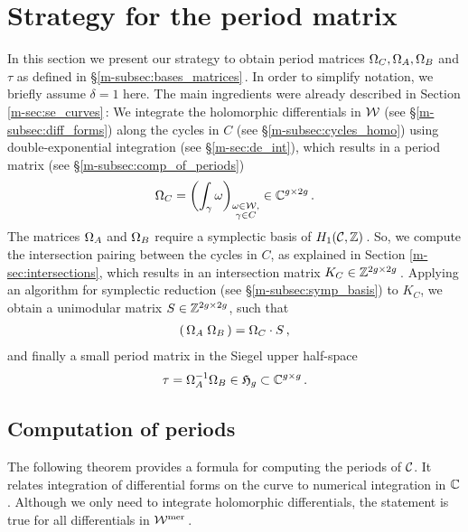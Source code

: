 \documentclass[main.tex]{subfiles}
\begin{document}
  \section{Strategy for the period matrix}\label{sec:strat_pm}

  In this section we present our strategy to obtain period matrices $\Omega_C, \Omega_A, \Omega_B$ and $\tau$ as defined in \S \ref{m-subsec:bases_matrices}\,. In order to simplify notation, 
  we briefly assume $\delta = 1$ here. The main ingredients were already described in
  Section \ref{m-sec:se_curves}\,: \abstand We integrate the holomorphic differentials in $\mathcal{W}$ (see \S \ref{m-subsec:diff_forms})
  along the cycles in $C$ (see  \S \ref{m-subsec:cycles_homo}) using double-exponential integration (see \S \ref{m-sec:de_int}), which results in a period matrix (see \S \ref{m-subsec:comp_of_periods})
  \begin{align}
    \Omega_C = \left( \int_{\gamma} \omega \right)_{\substack{\omega \in \mathcal{W}, \\ \gamma \in C}} \in \mathbb{C}^{g \times 2g}\,.
  \end{align}
  The matrices $\Omega_A$ and $\Omega_B$ require a symplectic basis of $H_1(\mathcal{C},\mathbb{Z})$\,.
  So, we compute the intersection pairing between the cycles in $C$, as explained in Section \ref{m-sec:intersections}, which results in an
  intersection matrix $K_C \in \mathbb{Z}^{2g \times 2g}$\,. \abstand
  Applying an algorithm for symplectic reduction (see \S \ref{m-subsec:symp_basis}) to $K_C$, we obtain a unimodular matrix $S \in \mathbb{Z}^{2g \times 2g}$, such that
  \begin{align}
   ( \, \Omega_A \; \Omega_B \, ) = \Omega_C \cdot S\,,
   \end{align}
   and finally a small period matrix in the Siegel upper half-space
   \begin{align}
   \tau = \Omega_A^{-1} \Omega_B \in \mathfrak{H}_g \subset \mathbb{C}^{g \times g}\,.
  \end{align}
  
  \bigskip
  
  \subsection{Computation of periods}\label{subsec:comp_of_periods}
  
  The following theorem provides a formula for computing the periods of $\mathcal{C}$. It relates integration of differential forms on the curve to numerical integration in $\mathbb{C}$.
  Although we only need to integrate holomorphic
  differentials, the statement is true for all differentials in $\mathcal{W}^{\text{mer}}$\,.
  
\end{document}
